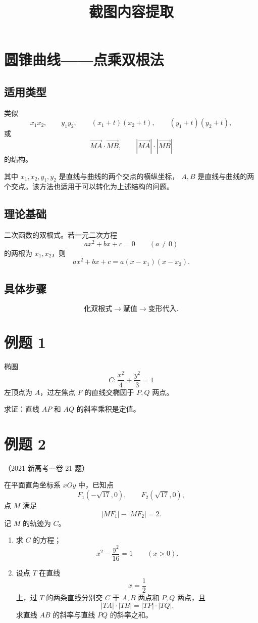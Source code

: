 \documentclass[12pt]{ctexart}
\title{截图内容提取}
\author{}
\date{}
\begin{document}
\maketitle

\section*{圆锥曲线——点乘双根法}

\subsection*{适用类型}

类似
\[
x_1x_2,\qquad y_1y_2,\qquad (x_1+t)(x_2+t),\qquad (y_1+t)(y_2+t),
\]
或
\[
\overrightarrow{MA}\cdot\overrightarrow{MB},\qquad
|\overrightarrow{MA}|\cdot|\overrightarrow{MB}|
\]
的结构。

其中 $x_1,x_2,y_1,y_2$ 是直线与曲线的两个交点的横纵坐标，
$A,B$ 是直线与曲线的两个交点。该方法也适用于可以转化为上述结构的问题。

\subsection*{理论基础}

二次函数的双根式。若一元二次方程
\[
ax^2+bx+c=0\qquad (a\ne 0)
\]
的两根为 $x_1,x_2$，则
\[
ax^2+bx+c=a(x-x_1)(x-x_2).
\]

\subsection*{具体步骤}

\[
\text{化双根式}\longrightarrow \text{赋值}\longrightarrow \text{变形代入}.
\]

\section*{例题 1}

椭圆
\[
C:\frac{x^2}{4}+\frac{y^2}{3}=1
\]
左顶点为 $A$，过左焦点 $F$ 的直线交椭圆于 $P,Q$ 两点。

求证：直线 $AP$ 和 $AQ$ 的斜率乘积是定值。

\section*{例题 2}

（2021 新高考一卷 21 题）

在平面直角坐标系 $xOy$ 中，已知点
\[
F_1(-\sqrt{17},0),\qquad F_2(\sqrt{17},0),
\]
点 $M$ 满足
\[
|MF_1|-|MF_2|=2.
\]
记 $M$ 的轨迹为 $C$。

\begin{enumerate}
  \item 求 $C$ 的方程；
  \[
  x^2-\frac{y^2}{16}=1\qquad (x>0).
  \]

  \item 设点 $T$ 在直线
  \[
  x=\frac12
  \]
  上，过 $T$ 的两条直线分别交 $C$ 于 $A,B$ 两点和 $P,Q$ 两点，且
  \[
  |TA|\cdot|TB|=|TP|\cdot|TQ|.
  \]
  求直线 $AB$ 的斜率与直线 $PQ$ 的斜率之和。
\end{enumerate}
\end{document}
